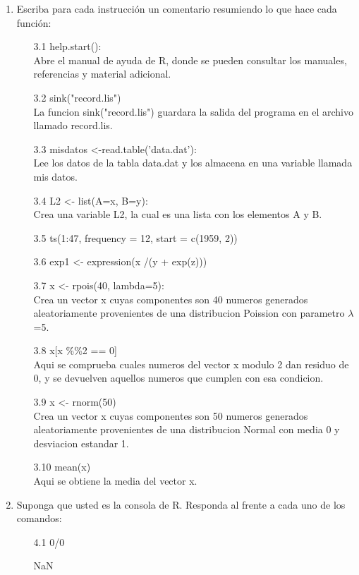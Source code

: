 \documentclass[letterpaper, 12pt]{article}
\begin{document}
\begin{enumerate}
\item Escriba para cada instrucción un comentario resumiendo lo que hace
cada función:
\begin{enumerate}
\item[3.1] help.start():\\
Abre el manual de ayuda de R, donde se pueden consultar los manuales, referencias 
y material adicional.
\item[3.2] sink("record.lis")\\
La funcion sink("record.lis") guardara la salida del programa en el archivo 
llamado record.lis.
\item[3.3] misdatos <-read.table('data.dat'):\\ 
Lee los datos de la tabla data.dat y los almacena en una variable llamada mis 
datos.
\item[3.4] L2 <- list(A=x, B=y):\\
Crea una variable L2, la cual es una lista con los elementos A y B.
\item[3.5] ts(1:47, frequency = 12, start = c(1959, 2))
\item[3.6] exp1 <- expression(x /(y + exp(z)))
\item[3.7] x <- rpois(40, lambda=5):\\
Crea un vector x cuyas componentes son 40 numeros generados aleatoriamente 
provenientes de una distribucion Poission con parametro $\lambda$=5.
\item[3.8] x[x \%\%2 == 0]\\
Aqui se comprueba cuales numeros del vector x modulo 2 dan residuo de 0, y se 
devuelven aquellos numeros que cumplen con esa condicion.
\item[3.9] x <- rnorm(50)\\
Crea un vector x cuyas componentes son 50 numeros generados aleatoriamente 
provenientes de una distribucion Normal con media 0 y desviacion estandar 1.
\item[3.10] mean(x)\\
Aqui se obtiene la media del vector x.
\end{enumerate}

\item Suponga que usted es la consola de R. Responda al frente a cada uno
de los comandos:
\begin{enumerate}
\item[4.1] 0/0

\begin{Schunk}
\begin{Soutput}
[1] NaN
\end{Soutput}
\end{Schunk}


\end{enumerate}
\end{enumerate}
\end{document}
